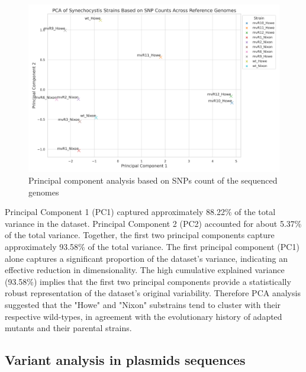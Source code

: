 \documentclass[12pt]{article}
\begin{document}
\begin{figure}[H]
    \centering
    \includegraphics[width=\hsize]{../Figures/MV_adaptation/PCA_Synechocystis_Strains_SNP_Counts.png}
    \caption{Principal component analysis based on SNPs count of the sequenced genomes}
    \label{fig:PCA}
\end{figure}

Principal Component 1 (PC1) captured approximately 88.22\% of the total variance in the dataset. Principal Component 2 (PC2) accounted for about 5.37\% of the total variance. Together, the first two principal components capture approximately 93.58\% of the total variance. The first principal component (PC1) alone captures a significant proportion of the dataset's variance, indicating an effective reduction in dimensionality. The high cumulative explained variance (93.58\%) implies that the first two principal components provide a statistically robust representation of the dataset's original variability.
Therefore PCA analysis suggested that the "Howe" and "Nixon" substrains tend to cluster with their respective wild-types, in agreement with the evolutionary history of adapted mutants and their parental strains.


\subsection{Variant analysis in plasmids sequences}
\end{document}

